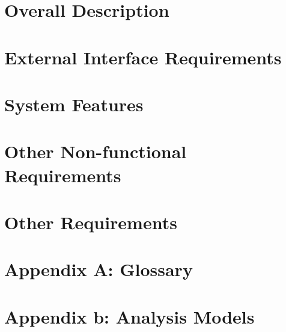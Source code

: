 \documentclass{article}
\begin{document}
\section{Overall Description}
\section{External Interface Requirements}
\section{System Features}
\section{Other Non-functional Requirements}
\section{Other Requirements}
\section*{Appendix A: Glossary}
\section*{Appendix b: Analysis Models}
\end{document}
